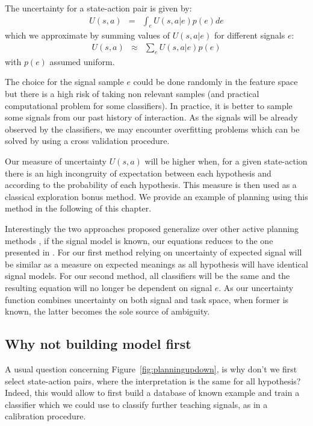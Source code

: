 The uncertainty for a state-action pair is given by:
\begin{eqnarray}
U(s,a) & = & \int_{e} U(s,a|e) p(e) de
\end{eqnarray}
which we approximate by summing values of $U(s,a|e)$ for different signals $e$:
\begin{eqnarray}
U(s,a) & \approx & \sum_{e} U(s,a|e) p(e)
\label{eq:planning}
\end{eqnarray}
with $p(e)$ assumed uniform. 

The choice for the signal sample $e$ could be done randomly in the feature space but there is a high risk of taking non relevant samples (and practical computational problem for some classifiers). In practice, it is better to sample some signals from our past history of interaction. As the signals will be already observed by the classifiers, we may encounter overfitting problems which can be solved by using a cross validation procedure.

Our measure of uncertainty $U(s,a)$ will be higher when, for a given state-action there is an high incongruity of expectation between each hypothesis and according to the probability of each hypothesis. This measure is then used as a classical exploration bonus method. We provide an example of planning using this method in the following of this chapter.

\transition

Interestingly the two approaches proposed generalize over other active planning methods \cite{lopes2009active}, if the signal model is known, our equations reduces to the one presented in \cite{macl11simul}. For our first method relying on uncertainty of expected signal will be similar as a measure on expected meanings as all hypothesis will have identical signal models. For our second method, all classifiers will be the same and the resulting equation will no longer be dependent on signal $e$. As our uncertainty function combines uncertainty on both signal and task space, when former is known, the latter becomes the sole source of ambiguity.

\subsection{Why not building model first}

A usual question concerning Figure~\ref{fig:planningupdown}, is why don't we first select state-action pairs, where the interpretation is the same for all hypothesis? Indeed, this would allow to first build a database of known example and train a classifier which we could use to classify further teaching signals, as in a calibration procedure.

